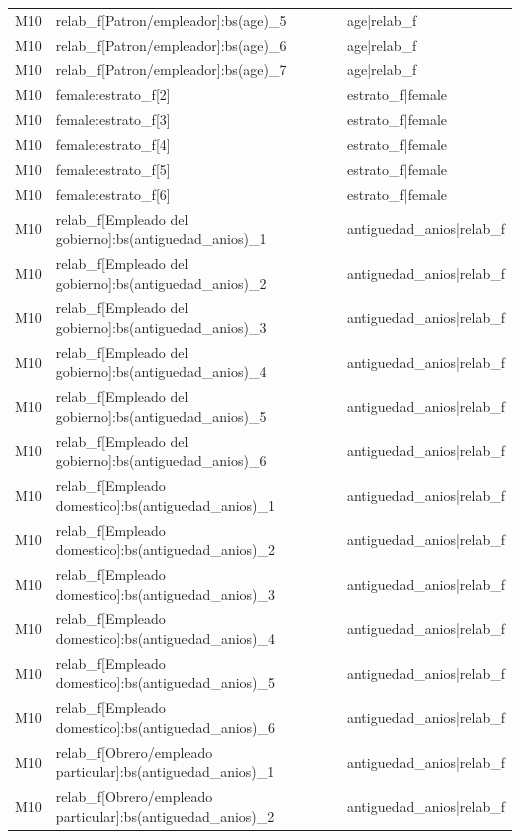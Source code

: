\begin{longtable}{lll}
M10 & relab\_f[Patron/empleador]:bs(age)\_5 & age|relab\_f \\
M10 & relab\_f[Patron/empleador]:bs(age)\_6 & age|relab\_f \\
M10 & relab\_f[Patron/empleador]:bs(age)\_7 & age|relab\_f \\
M10 & female:estrato\_f[2] & estrato\_f|female \\
M10 & female:estrato\_f[3] & estrato\_f|female \\
M10 & female:estrato\_f[4] & estrato\_f|female \\
M10 & female:estrato\_f[5] & estrato\_f|female \\
M10 & female:estrato\_f[6] & estrato\_f|female \\
M10 & relab\_f[Empleado del gobierno]:bs(antiguedad\_anios)\_1 & antiguedad\_anios|relab\_f \\
M10 & relab\_f[Empleado del gobierno]:bs(antiguedad\_anios)\_2 & antiguedad\_anios|relab\_f \\
M10 & relab\_f[Empleado del gobierno]:bs(antiguedad\_anios)\_3 & antiguedad\_anios|relab\_f \\
M10 & relab\_f[Empleado del gobierno]:bs(antiguedad\_anios)\_4 & antiguedad\_anios|relab\_f \\
M10 & relab\_f[Empleado del gobierno]:bs(antiguedad\_anios)\_5 & antiguedad\_anios|relab\_f \\
M10 & relab\_f[Empleado del gobierno]:bs(antiguedad\_anios)\_6 & antiguedad\_anios|relab\_f \\
M10 & relab\_f[Empleado domestico]:bs(antiguedad\_anios)\_1 & antiguedad\_anios|relab\_f \\
M10 & relab\_f[Empleado domestico]:bs(antiguedad\_anios)\_2 & antiguedad\_anios|relab\_f \\
M10 & relab\_f[Empleado domestico]:bs(antiguedad\_anios)\_3 & antiguedad\_anios|relab\_f \\
M10 & relab\_f[Empleado domestico]:bs(antiguedad\_anios)\_4 & antiguedad\_anios|relab\_f \\
M10 & relab\_f[Empleado domestico]:bs(antiguedad\_anios)\_5 & antiguedad\_anios|relab\_f \\
M10 & relab\_f[Empleado domestico]:bs(antiguedad\_anios)\_6 & antiguedad\_anios|relab\_f \\
M10 & relab\_f[Obrero/empleado particular]:bs(antiguedad\_anios)\_1 & antiguedad\_anios|relab\_f \\
M10 & relab\_f[Obrero/empleado particular]:bs(antiguedad\_anios)\_2 & antiguedad\_anios|relab\_f \\

\end{longtable}
